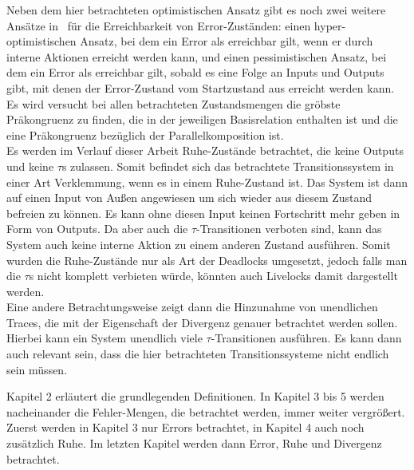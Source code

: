Neben dem hier betrachteten optimistischen Ansatz gibt es noch zwei weitere
Ansätze in~\cite{Vogler2014EIO} für die Erreichbarkeit von Error-Zuständen:
einen hyper-optimistischen Ansatz, bei dem ein Error als erreichbar gilt, wenn
er durch interne Aktionen erreicht werden kann, und einen pessimistischen
Ansatz, bei dem ein Error als erreichbar gilt, sobald es eine Folge an Inputs
und Outputs gibt, mit denen der Error-Zustand vom Startzustand aus erreicht
werden kann.\\
Es wird versucht bei allen betrachteten Zustandsmengen die gröbste Präkongruenz zu
finden, die in der jeweiligen Basisrelation enthalten ist und die eine
Präkongruenz bezüglich der Parallelkomposition ist.\\
Es werden im Verlauf dieser Arbeit Ruhe-Zustände betrachtet, die keine Outputs
und keine $\tau$s zulassen. Somit befindet sich das betrachtete
Transitionssystem in einer Art Verklemmung, wenn es in einem Ruhe-Zustand ist.
Das System ist dann auf einen Input von Außen angewiesen um sich wieder aus
diesem Zustand befreien zu können. Es kann ohne diesen Input keinen Fortschritt
mehr geben in Form von Outputs. Da aber auch die $\tau$-Transitionen verboten
sind, kann das System auch keine interne Aktion zu einem anderen Zustand
ausführen. Somit wurden die Ruhe-Zustände nur als Art der Deadlocks umgesetzt,
jedoch falls man die $\tau$s nicht komplett verbieten würde, könnten auch
Livelocks damit dargestellt werden.\\
Eine andere Betrachtungsweise zeigt dann die Hinzunahme von unendlichen Traces,
die mit der Eigenschaft der Divergenz genauer betrachtet werden sollen. Hierbei
kann ein System unendlich viele $\tau$-Transitionen ausführen. Es kann dann
auch relevant sein, dass die hier betrachteten Transitionssysteme nicht endlich sein
müssen.

Kapitel 2 erläutert die grundlegenden Definitionen. In Kapitel 3 bis 5 werden
nacheinander die Fehler-Mengen, die betrachtet werden, immer weiter vergrößert.
Zuerst werden in Kapitel 3 nur Errors betrachtet, in Kapitel 4 auch noch
zusätzlich Ruhe. Im letzten Kapitel werden dann Error, Ruhe und Divergenz
betrachtet.

